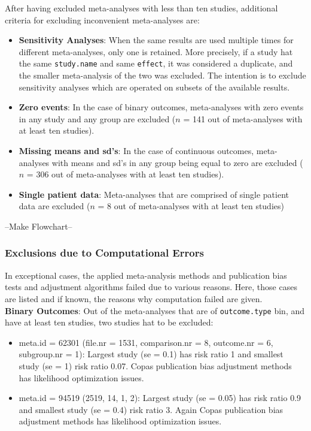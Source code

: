 \documentclass[11pt,a4paper,twoside]{book}\usepackage[]{graphicx}\usepackage[]{color}
\begin{document}
After having excluded meta-analyses with less than ten studies, additional criteria for excluding inconvenient meta-analyses are:
\begin{itemize}
\item \textbf{Sensitivity Analyses}: When the same results are used multiple times for different meta-analyses, only one is retained. More precisely, if a study hat the same \texttt{study.name} and same \texttt{effect}, it was considered a duplicate, and the smaller meta-analysis of the two was excluded. The intention is to exclude sensitivity analyses which are operated on subsets of the available results.
\item \textbf{Zero events}: In the case of binary outcomes, meta-analyses with zero events in any study and any group are excluded ($n$ = 141 out of meta-analyses with at least ten studies).
\item \textbf{Missing means and sd's}: In the case of continuous outcomes, meta-analyses with means and sd's in any group being equal to zero are excluded ($n$ = 306 out of meta-analyses with at least ten studies).
\item \textbf{Single patient data}: Meta-analyses that are comprised of single patient data are excluded ($n$ = 8 out of meta-analyses with at least ten studies)
\end{itemize}

--Make Flowchart--

\subsubsection{Exclusions due to Computational Errors}
In exceptional cases, the applied meta-analysis methods and publication bias tests and adjustment algorithms failed due to various reasons. Here, those cases are listed and if known, the reasons why computation failed are given.\\
\textbf{Binary Outcomes}: Out of the meta-analyses that are of \texttt{outcome.type} bin, and have at least ten studies, two studies hat to be excluded:
\begin{itemize}
\item meta.id = 62301 (file.nr = 1531, comparison.nr = 8, outcome.nr = 6, subgroup.nr = 1):
Largest study (se = 0.1) has risk ratio 1 and smallest study (se = 1) risk ratio 0.07. Copas publication bias adjustment methods has likelihood optimization issues.
\item meta.id = 94519 (2519, 14, 1, 2): Largest study (se = 0.05) has risk ratio 0.9 and smallest study (se = 0.4) risk ratio 3. Again Copas publication bias adjustment methods has likelihood optimization issues.
\end{itemize}
\end{document}
